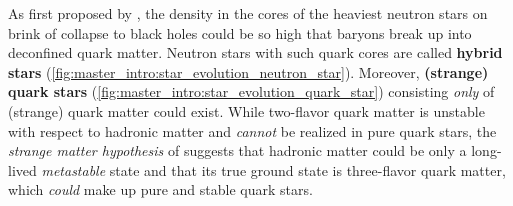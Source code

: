 As first proposed by \cite{ref:quark_star_proposition_1,ref:quark_star_proposition_2},
the density in the cores of the heaviest neutron stars on brink of collapse to black holes could be so high 
that baryons break up into deconfined quark matter.
Neutron stars with such quark cores are called \textbf{hybrid stars} (\cref{fig:master_intro:star_evolution_neutron_star}).
Moreover, \textbf{(strange) quark stars} (\cref{fig:master_intro:star_evolution_quark_star}) consisting \emph{only} of (strange) quark matter could exist. \cite{ref:glendenning}
While two-flavor quark matter is unstable with respect to hadronic matter and \emph{cannot} be realized in pure quark stars,
the \emph{strange matter hypothesis} of \cite{ref:strange_hypothesis_bodmer,ref:strange_hypothesis_witten} suggests that
hadronic matter could be only a long-lived \emph{metastable} state and that its true ground state is three-flavor quark matter,
which \emph{could} make up pure and stable quark stars.

